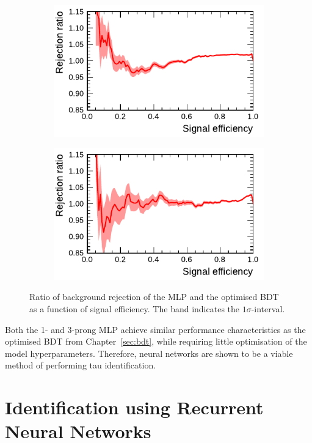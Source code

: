 \begin{figure}[htb]
  \begin{subfigure}[t]{0.48\textwidth}
    \centering
    \includegraphics{./figures/rnn/mlp/mlp_bdt_ratio_1p.pdf}
  \end{subfigure}\hfill
  \begin{subfigure}[t]{0.48\textwidth}
    \centering
    \includegraphics{./figures/rnn/mlp/mlp_bdt_ratio_3p.pdf}
  \end{subfigure}
  \caption{Ratio of background rejection of the MLP and the optimised BDT as a
    function of signal efficiency. The band indicates the $1\sigma$-interval.}
  \label{fig:roc_mlp_bdt_comparison}
\end{figure}

Both the 1- and 3-prong MLP achieve similar performance characteristics as the
optimised BDT from Chapter~\ref{sec:bdt}, while requiring little optimisation of
the model hyperparameters. Therefore, neural networks are shown to be a viable
method of performing tau identification.

\section{Identification using Recurrent Neural Networks}
\label{sec:rnn_id}

